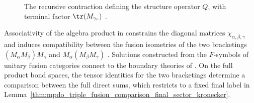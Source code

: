\begin{figure}[ht]
\begin{tenkz}[rows={wire,wire,wire,wire,wire,wire}, cols=19, bonds=none,
            metrics=compact]
    \end{tenkz}
    \caption{The recursive contraction defining the structure operator $Q$,
        with terminal factor $\tr(M_{\gamma_r})$
        \cite[lines~999--1008]{Cirac2016MPDO_arXiv}.}
    \label{fig:mpdo_recursive_structure_operator}
\end{figure}

Associativity of the algebra product in
\cite[Equation~(87)]{Cirac2016MPDO_arXiv}
constrains the diagonal matrices $\chi_{\alpha,\beta,\gamma}$ and induces
compatibility between the fusion isometries of the two bracketings
$(M_\alpha M_\beta) M_\gamma$ and $M_\alpha (M_\beta M_\gamma)$
\cite[lines~995--999]{Cirac2016MPDO_arXiv}. Solutions constructed from the
$F$-symbols of unitary fusion categories connect to the boundary theories of
\cite{Bultinck2017Anyons}. On the full product bond spaces, the tensor
identities for the two bracketings determine a comparison between the full
direct sums, which restricts to a fixed final label in
Lemma~\ref{thm:mpdo_triple_fusion_comparison_final_sector_kronecker}.

